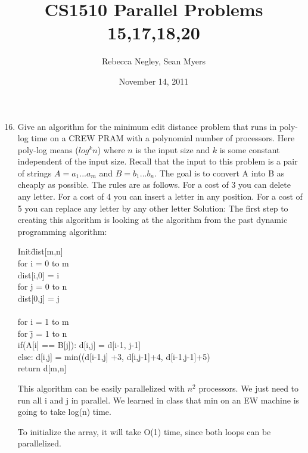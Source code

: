 \documentclass{article}
\title{CS1510  Parallel Problems 15,17,18,20}
\author{Rebecca Negley, Sean Myers}
\date{November 14, 2011}
\begin{document}
\maketitle

\begin{enumerate}
\setcounter{enumi}{15}
\item Give an algorithm for the minimum edit distance problem that runs in poly-log time on a CREW
\newline PRAM with a polynomial number of processors. Here poly-log means ($log^kn$) where $n$ is the 
\newline input size and $k$ is some constant independent of the input size.
\newline Recall that the input to this problem is a pair of strings $A = a_1 ...  a_m$ and $B = b_1 ... b_n$. The goal is
\newline to convert A into B as cheaply as possible. The rules are as follows. For a cost of 3 you can delete any
\newline letter. For a cost of 4 you can insert a letter in any position. For a cost of 5 you can replace any letter
\newline by any other letter
\newline Solution: The first step to creating this algorithm is looking at the algorithm from the past dynamic programming algorithm:
\begin{tabbing}
Init\= dist[m,n]\\
for i = 0 to m\\
\>dist[i,0] = i\\
for j = 0 to n\\
\>dist[0,j] = j\\
\\
for i = 1 to m\\
\>for \=j = 1 to n\\
\>\>if(A[i] == B[j]): d[i,j] = d[i-1, j-1]\\
\>\>else: d[i,j] = min((d[i-1,j] +3, d[i,j-1]+4, d[i-1,j-1]+5)\\

return d[m,n]
\end{tabbing}

This algorithm can be easily parallelized with $n^2$ processors. We just need to run all i and j in parallel. We learned in class that min on an EW machine is going to take log(n) time. 

To initialize the array, it will take O(1) time, since both loops can be parallelized. 


\end{enumerate}
\end{document}
